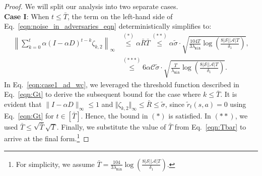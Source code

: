 \documentclass{article}
\newcommand{\mc}{\mathcal}
\begin{document}
\begin{proof}
We will split our analysis into two separate cases.\\
\textbf{Case I}: When \( t \leq \bar{T} \), the term on the left-hand side of Eq.~\eqref{eqn:noise_in_adversaries_eqn} deterministically simplifies to:
 \begin{equation}\label{eqn:case1_ad_wc}\begin{aligned}
     \left\lVert \sum_{k=0}^{t} \alpha (I-\alpha D)^{t-k}\mathcal{\zeta}_{k,2}\right\rVert_\infty &\overset{(*)}{\le} \alpha \bar{R} \bar{T} \overset{(**)}{\le} \alpha \tilde{\sigma} \cdot\sqrt{\frac{104 T}{3\lambda_{\texttt{min}}} \log \left(\frac{8 |\mc{S}||\mc{A}|T}{\delta_1}\right)}, \\
     & \overset{(***)}{\le} 6 \alpha \mc{C} \tilde{\sigma} \cdot\sqrt{\frac{T}{\lambda_{\texttt{min}}}\log\left(\frac{8|\mathcal{S}||\mathcal{A}|T}{\delta_1}\right)}.
     \end{aligned}
 \end{equation}
In Eq.~\eqref{eqn:case1_ad_wc}, we leveraged the threshold function described in Eq.~\eqref{eqn:Gt} to derive the subsequent bound for the case where \( k \le \bar{T} \). It is evident that $\lVert I - \alpha D \rVert_\infty \leq 1$ and $ \Vert \zeta_{k,2} \Vert_{\infty} \leq \bar{R} \leq \tilde{\sigma}$, since $\tilde{r}_t(s,a) = 0$ using Eq.~\eqref{eqn:Gt} for \(t \in [\bar{T}]\). Hence, the bound in $(*)$ is satisfied. In \((**)\), we used \( \bar{T} \le \sqrt{\bar{T}}\sqrt{T} \). Finally, we substitute the value of \( \bar{T} \) from Eq.~\eqref{eqn:Tbar} to arrive at the final form.\footnote{For simplicity, we assume $\bar{T} = \frac{104}{3\lambda_{\texttt{min}}} \log \left(\frac{8 |\mathcal{S}||\mathcal{A}|T}{\delta_1}\right)$.
}


\end{proof}
\end{document}
